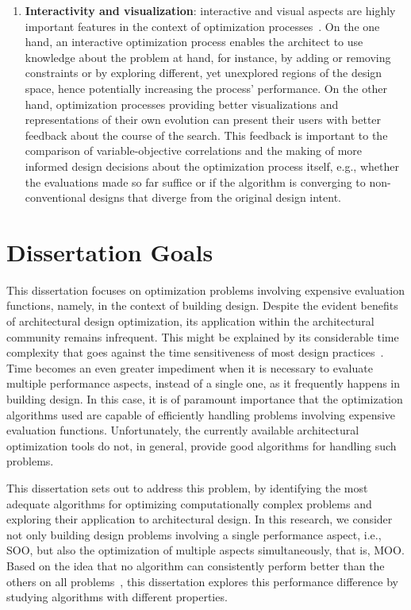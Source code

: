 \begin{enumerate}
\item \textbf{Interactivity and visualization}: interactive and visual aspects are highly important features in the context of optimization processes~\cite{Ashour2015CreativelyMOO}. On the one hand, an interactive optimization process enables the architect to use knowledge about the problem at hand, for instance, by adding or removing constraints or by exploring different, yet unexplored regions of the design space, hence potentially increasing the process' performance. On the other hand, optimization processes providing better visualizations and representations of their own evolution can present their users with better feedback about the course of the search. This feedback is important to the comparison of variable-objective correlations and the making of more informed design decisions about the optimization process itself, e.g., whether the evaluations made so far suffice or if the algorithm is converging to non-conventional designs that diverge from the original design intent.
\end{enumerate}

\section{Dissertation Goals}
\label{sec:goals}

This dissertation focuses on optimization problems involving expensive evaluation functions, namely, in the context of building design. Despite the evident benefits of architectural design optimization, its application within the architectural community remains infrequent. This might be explained by its considerable time complexity that goes against the time sensitiveness of most design practices~\cite{Shi2016}. Time becomes an even greater impediment when it is necessary to evaluate multiple performance aspects, instead of a single one, as it frequently happens in building design. In this case, it is of paramount importance that the optimization algorithms used are capable of efficiently handling problems involving expensive evaluation functions. Unfortunately, the currently available architectural optimization tools do not, in general, provide good algorithms for handling such problems.

This dissertation sets out to address this problem, by identifying the most adequate algorithms for optimizing computationally complex problems and exploring their application to architectural design. In this research, we consider not only building design problems involving a single performance aspect, i.e., \ac{SOO}, but also the optimization of multiple aspects simultaneously, that is, \ac{MOO}. Based on the idea that no algorithm can consistently perform better than the others on all problems~\cite{Wolpert1997NFLT}, this dissertation explores this performance difference by studying algorithms with different properties. 

